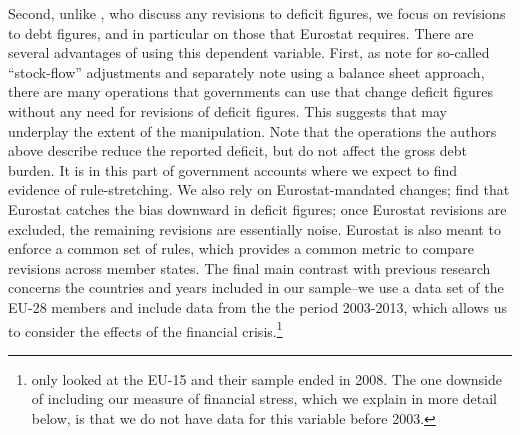 \documentclass[]{article}
\begin{document}
Second, unlike \cite{DeCastro2013}, who discuss any revisions to deficit figures, we focus on  revisions to debt figures, and in particular on those that Eurostat requires. There are several advantages of using this dependent variable. First, as \cite{vonHagenWolff2006} note for so-called ``stock-flow'' adjustments and \cite{MilesiMoriyama2006}  separately note using a balance sheet approach, there are many operations that governments can use that change deficit figures without any need for revisions of deficit figures. This suggests that \cite{DeCastro2013} may underplay the extent of the manipulation. Note that the operations the authors above describe reduce the reported deficit, but do not affect the gross debt burden. It is in this part of government accounts where we expect to find evidence of rule-stretching. We also rely on Eurostat-mandated changes;  \cite{DeCastro2013} find that Eurostat catches the bias downward in deficit figures; once Eurostat revisions are excluded, the remaining revisions are essentially noise. Eurostat is also meant to enforce a common set of rules, which provides a common metric to compare revisions across member states. The final main contrast with previous research concerns the countries and years included in our sample--we use a data set of the EU-28 members and include data from the the period 2003-2013, which allows us to consider the effects of the financial crisis.\footnote{\cite{DeCastro2013} only looked at the EU-15 and their sample ended in 2008. The one downside of including our measure of financial stress, which we explain in more detail below, is that we do not have data for this variable before 2003.}

\end{document}
